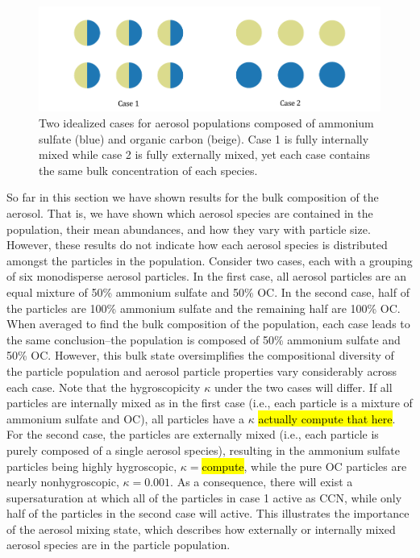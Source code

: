 \begin{figure}[!t]
  \centering
    \includegraphics[width=\textwidth]{figures/chapter5/mixing-state-ideal-cases.pdf}
    \caption{Two idealized cases for aerosol populations composed of ammonium sulfate (blue) and organic carbon (beige). Case 1 is fully internally mixed while case 2 is fully externally mixed, yet each case contains the same bulk concentration of each species.}
    \label{fig:mixing-state-scenarios}
\end{figure}

So far in this section we have shown results for the bulk composition of the aerosol. That is, we have shown which aerosol species are contained in the population, their mean abundances, and how they vary with particle size. However, these results do not indicate how each aerosol species is distributed amongst the particles in the population. Consider two cases, each with a grouping of six monodisperse aerosol particles. In the first case, all aerosol particles are an equal mixture of 50\% ammonium sulfate and 50\% OC. In the second case, half of the particles are 100\% ammonium sulfate and the remaining half are 100\% OC. When averaged to find the bulk composition of the population, each case leads to the same conclusion--the population is composed of 50\% ammonium sulfate and 50\% OC. However, this bulk state oversimplifies the compositional diversity of the particle population and aerosol particle properties vary considerably across each case. Note that the hygroscopicity $\kappa$ under the two cases will differ. If all particles are internally mixed as in the first case (i.e., each particle is a mixture of ammonium sulfate and OC), all particles have a $\kappa$ \hl{actually compute that here}. For the second case, the particles are externally mixed (i.e., each particle is purely composed of a single aerosol species), resulting in the ammonium sulfate particles being highly hygroscopic, $\kappa=$\hl{compute}, while the pure OC particles are nearly nonhygroscopic, $\kappa=0.001$. As a consequence, there will exist a supersaturation at which all of the particles in case 1 active as CCN, while only half of the particles in the second case will active. This illustrates the importance of the aerosol mixing state, which describes how externally or internally mixed aerosol species are in the particle population. 

